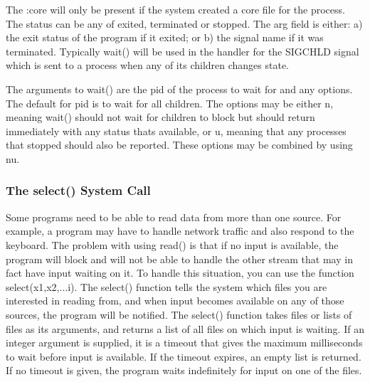 The \textsf{{\textquotedbl}:core{\textquotedbl}} will only be present if
the system created a core file for the process. The status can be any
of \textsf{{\textquotedbl}exited{\textquotedbl}},
\textsf{{\textquotedbl}terminated{\textquotedbl}} or
\textsf{{\textquotedbl}stopped{\textquotedbl}}. The \textsf{arg} field
is either: a) the exit status of the program if it exited; or b) the
signal name if it was terminated. Typically \textsf{wait()} will be
used in the handler for the \textsf{SIGCHLD} signal which is sent to a
process when any of its children changes state.

The arguments to \textsf{wait()} are the pid of the process to wait for
and any options. The default for pid is to wait for all children. The
options may be either \textsf{{\textquotedbl}n{\textquotedbl}}, meaning
\textsf{wait()} should not wait for children to block but should return
immediately with any status that{\textquotesingle}s available, or
\textsf{{\textquotedbl}u{\textquotedbl}}, meaning that any processes
that stopped should also be reported. These options may be combined by
using \textsf{{\textquotedbl}nu{\textquotedbl}}.

\subsubsection[The select() System Call]{The select() System Call}
Some programs need to be able to read data from more than one source.
For example, a program may have to handle network traffic and also
respond to the keyboard. The problem with using
\textsf{read()} is that if no input is available, the program will
block and will not be able to handle the other stream that may in fact
have input waiting on it. To handle this situation, you can use the
function \textsf{select(x1,x2,...i)}. The
\textsf{select()} function tells the system which files
you are interested in reading from, and when input becomes available on
any of those sources, the program will be notified. The
\textsf{select()} function takes files or lists of files as its
arguments, and returns a list of all files on which input is waiting.
If an integer argument is supplied, it is a timeout that gives the
maximum milliseconds to wait before input is available. If the timeout
expires, an empty list is returned. If no timeout is given, the program
waits indefinitely for input on one of the files.


